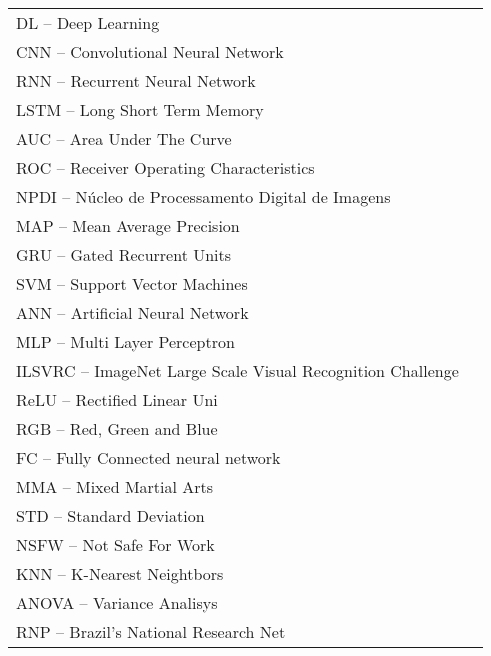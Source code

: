 
\begin{thenotations}
\renewcommand{\arraystretch}{1.5}
  \noindent
  \begin{tabular}{ll}

DL -- Deep Learning\\
CNN -- Convolutional Neural Network\\
RNN -- Recurrent Neural Network\\
LSTM -- Long Short Term Memory\\
AUC -- Area Under The Curve\\
ROC -- Receiver Operating Characteristics\\
NPDI -- Núcleo de Processamento Digital de Imagens\\
MAP -- Mean Average Precision\\
GRU -- Gated Recurrent Units\\
SVM -- Support Vector Machines\\
ANN -- Artificial Neural Network\\
MLP -- Multi Layer Perceptron\\
ILSVRC -- ImageNet Large Scale Visual Recognition Challenge\\
ReLU --  Rectified Linear Uni\\
RGB -- Red, Green and Blue\\
FC -- Fully Connected neural network\\
MMA -- Mixed Martial Arts\\
STD -- Standard Deviation\\
NSFW -- Not Safe For Work\\
KNN -- K-Nearest Neightbors\\
ANOVA -- Variance Analisys\\
RNP -- Brazil's National Research Net

\end{tabular}

\end{thenotations}